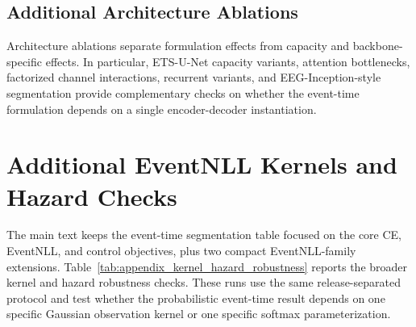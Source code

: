 \documentclass[12pt]{article}
\begin{document}
\subsection{Additional Architecture Ablations}

Architecture ablations separate formulation effects from capacity and backbone-specific effects. In particular, ETS-U-Net capacity variants, attention bottlenecks, factorized channel interactions, recurrent variants, and EEG-Inception-style segmentation provide complementary checks on whether the event-time formulation depends on a single encoder-decoder instantiation.

\section{Additional EventNLL Kernels and Hazard Checks}

The main text keeps the event-time segmentation table focused on the core CE, EventNLL, and control objectives, plus two compact EventNLL-family extensions. Table~\ref{tab:appendix_kernel_hazard_robustness} reports the broader kernel and hazard robustness checks. These runs use the same release-separated protocol and test whether the probabilistic event-time result depends on one specific Gaussian observation kernel or one specific softmax parameterization.
\end{document}
